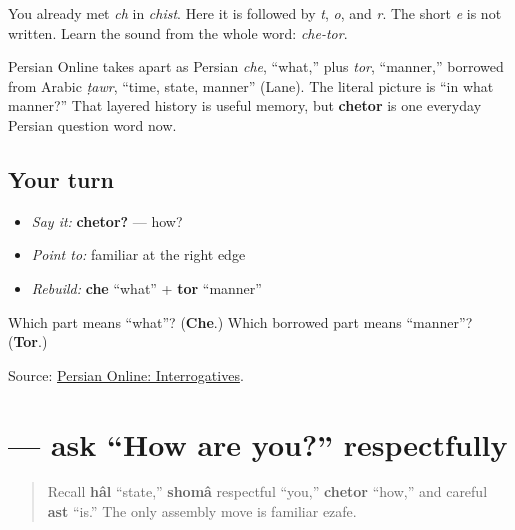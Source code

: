 You already met \textbf{} \emph{ch} in \emph{chist}. Here it is followed by \textbf{} \emph{t}, \textbf{} \emph{o}, and \textbf{} \emph{r}. The short \emph{e} is not written. Learn the sound from the whole word: \emph{che-tor}.

\begin{cousinweb}
Persian Online takes \textbf{} apart as Persian \emph{che}, “what,” plus \textbf{} \emph{tor}, “manner,” borrowed from Arabic \emph{ṭawr}, “time, state, manner” (Lane). The literal picture is “in what manner?” That layered history is useful memory, but \textbf{chetor} is one everyday Persian question word now.
\end{cousinweb}

\subsection*{Your turn}
\begin{itemize}
\raggedright
  \item \emph{Say it:} \textbf{chetor?} — how?
  \item \emph{Point to:} familiar \textbf{} at the right edge
  \item \emph{Rebuild:} \textbf{che} “what” + \textbf{tor} “manner”
\end{itemize}

\begin{tcolorbox}[breakable,colback=teal!4,colframe=teal!35!black,title={Before you move on}]
Which part means “what”? (\textbf{Che}.) Which borrowed part means “manner”? (\textbf{Tor}.)

Source: \href{https://sites.la.utexas.edu/persian\_online\_resources/5-ws-h/}{Persian Online: Interrogatives}.
\end{tcolorbox}
\section[\texorpdfstring{\fa{حال} \fa{شما} \fa{چطور} \fa{است؟} (hâl-e shomâ …)}{حال شما چطور است؟ (hâl-e shomâ …)}]{    — ask “How are you?” respectfully}

\label{lesson:FA-C04-hal-e-shoma-chetor-ast}



\begin{quote}
Recall \textbf{hâl} “state,” \textbf{shomâ} respectful “you,” \textbf{chetor} “how,” and careful \textbf{ast} “is.” The only assembly move is familiar ezafe.
\end{quote}


